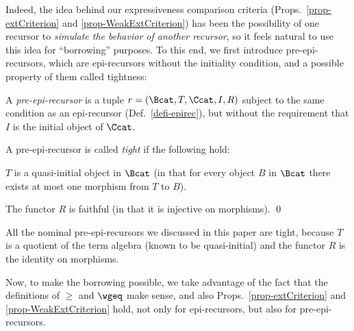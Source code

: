 Indeed, the idea behind our expressiveness comparison criteria (Props.~\ref{prop-extCriterion} and \ref{prop-WeakExtCriterion}) 
has been the possibility of one recursor to \emph{simulate the behavior of another 
recursor}, so it feels natural to use this idea for ``borrowing'' purposes. 
To this end, we first introduce pre-epi-recursors, which are epi-recursors without the initiality condition, and a possible property of them called tightness: 

\medskip 
\begin{defi}\rm 
	A \emph{pre-epi-recursor} is a tuple $r = (\Bcat,T,\Ccat,I,R)$ subject to the same condition as an epi-recursor (Def.~\ref{defi-epirec}), but without the requirement that $I$ is the initial object of $\Ccat$. 
	
	A pre-epi-recursor is called \emph{tight}  
	if the following hold:
	\begin{myitem} 
		\item $T$ is a quasi-initial object in $\Bcat$ (in that for every object $B$ in $\Bcat$ there exists at most one morphism from $T$ to $B$). 
		\item The functor $R$ is faithful (in that it is injective on morphisms).   	\qed 
	\end{myitem} 
\end{defi}
\medskip

All the nominal pre-epi-recursors we discussed in this paper are tight, because $T$ is a quotient of  the term algebra (known to be quasi-initial)
and the functor $R$ is the identity on morphisms. 

Now, to make the borrowing possible, 
we take advantage of the fact that the definitions of $\geq$ and $\wgeq$ make sense, and also  
Props.~\ref{prop-extCriterion} and \ref{prop-WeakExtCriterion} hold, 
%
not only for epi-recursors, but also for pre-epi-recursors. 

